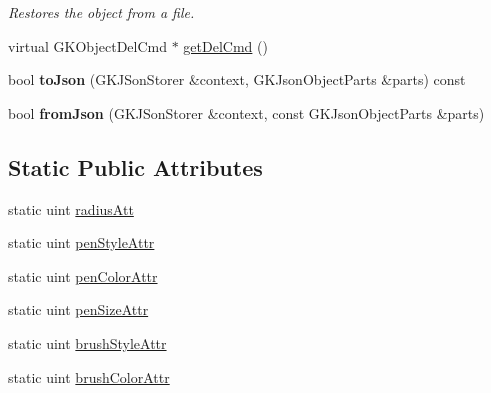 \begin{DoxyCompactItemize}
\begin{DoxyCompactList}\small\item\em Restores the object from a file. \end{DoxyCompactList}\item 
virtual G\+K\+Object\+Del\+Cmd $\ast$ \hyperlink{classGKCircle_ac7a927ddee87c516bb0764c38d937364}{get\+Del\+Cmd} ()
\item 
bool {\bfseries to\+Json} (G\+K\+J\+Son\+Storer \&context, G\+K\+Json\+Object\+Parts \&parts) const \hypertarget{classGKCircle_a7ddb37d3c39748cfd6e03c73b7c1280a}{}\label{classGKCircle_a7ddb37d3c39748cfd6e03c73b7c1280a}

\item 
bool {\bfseries from\+Json} (G\+K\+J\+Son\+Storer \&context, const G\+K\+Json\+Object\+Parts \&parts)\hypertarget{classGKCircle_a43d1bb224b7a6d5e8af99a01f6fc3cc1}{}\label{classGKCircle_a43d1bb224b7a6d5e8af99a01f6fc3cc1}

\end{DoxyCompactItemize}
\subsection*{Static Public Attributes}
\begin{DoxyCompactItemize}
\item 
static uint \hyperlink{classGKCircle_a270ea9935fb1b96d75e8a6e0fae0df58}{radius\+Att}
\item 
static uint \hyperlink{classGKCircle_a856335ddf2a8a08cf9dc883756987792}{pen\+Style\+Attr}
\item 
static uint \hyperlink{classGKCircle_a2fe3b334156d797f338f6266dfe1aa0b}{pen\+Color\+Attr}
\item 
static uint \hyperlink{classGKCircle_adc9c156f7bafda83d9e429bbd96f3764}{pen\+Size\+Attr}
\item 
static uint \hyperlink{classGKCircle_aa0a92a1ecdff12dfb393f5d86886d640}{brush\+Style\+Attr}
\item 
static uint \hyperlink{classGKCircle_a0c8f5f5a201442b85f1d9749fe359b22}{brush\+Color\+Attr}
\end{DoxyCompactItemize}
